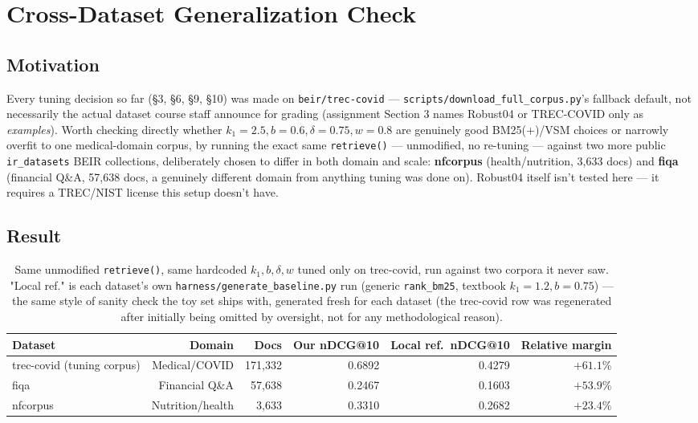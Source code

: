 \documentclass[11pt]{article}
\begin{document}
\section{Cross-Dataset Generalization Check}

\subsection{Motivation}
Every tuning decision so far (\S 3, \S 6, \S 9, \S 10) was made on
\texttt{beir/trec-covid} --- \texttt{scripts/download\_full\_corpus.py}'s
fallback default, not necessarily the actual dataset course staff
announce for grading (assignment Section 3 names Robust04 or TREC-COVID
only as \emph{examples}). Worth checking directly whether $k_1{=}2.5,
b{=}0.6,\delta{=}0.75,w{=}0.8$ are genuinely good BM25(+)/VSM choices or
narrowly overfit to one medical-domain corpus, by running the exact same
\texttt{retrieve()} --- unmodified, no re-tuning --- against two more
public \texttt{ir\_datasets} BEIR collections, deliberately chosen to
differ in both domain and scale: \textbf{nfcorpus} (health/nutrition,
3{,}633 docs) and \textbf{fiqa} (financial Q\&A, 57{,}638 docs, a
genuinely different domain from anything tuning was done on). Robust04
itself isn't tested here --- it requires a TREC/NIST license this setup
doesn't have.

\subsection{Result}
\begin{table}[h]
\centering
\begin{tabular}{lrrrrr}
\toprule
Dataset & Domain & Docs & Our nDCG@10 & Local ref.\ nDCG@10 & Relative margin \\
\midrule
trec-covid (tuning corpus) & Medical/COVID & 171{,}332 & 0.6892 & 0.4279 & $+61.1\%$ \\
fiqa & Financial Q\&A & 57{,}638 & 0.2467 & 0.1603 & $+53.9\%$ \\
nfcorpus & Nutrition/health & 3{,}633 & 0.3310 & 0.2682 & $+23.4\%$ \\
\bottomrule
\end{tabular}
\caption{Same unmodified \texttt{retrieve()}, same hardcoded
$k_1,b,\delta,w$ tuned only on trec-covid, run against two corpora it
never saw. "Local ref." is each dataset's own
\texttt{harness/generate\_baseline.py} run (generic \texttt{rank\_bm25},
textbook $k_1{=}1.2,b{=}0.75$) --- the same style of sanity check the
toy set ships with, generated fresh for each dataset (the trec-covid row
was regenerated after initially being omitted by oversight, not for any
methodological reason).}
\end{table}
\end{document}
